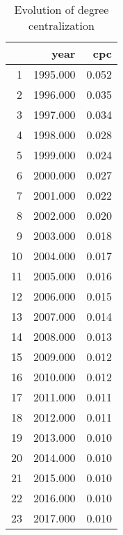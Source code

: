 \begin{table}[ht]
\centering
\begin{tabular}{rrr}
  \hline
 & year & cpc \\ 
  \hline
1 & 1995.000 & 0.052 \\ 
  2 & 1996.000 & 0.035 \\ 
  3 & 1997.000 & 0.034 \\ 
  4 & 1998.000 & 0.028 \\ 
  5 & 1999.000 & 0.024 \\ 
  6 & 2000.000 & 0.027 \\ 
  7 & 2001.000 & 0.022 \\ 
  8 & 2002.000 & 0.020 \\ 
  9 & 2003.000 & 0.018 \\ 
  10 & 2004.000 & 0.017 \\ 
  11 & 2005.000 & 0.016 \\ 
  12 & 2006.000 & 0.015 \\ 
  13 & 2007.000 & 0.014 \\ 
  14 & 2008.000 & 0.013 \\ 
  15 & 2009.000 & 0.012 \\ 
  16 & 2010.000 & 0.012 \\ 
  17 & 2011.000 & 0.011 \\ 
  18 & 2012.000 & 0.011 \\ 
  19 & 2013.000 & 0.010 \\ 
  20 & 2014.000 & 0.010 \\ 
  21 & 2015.000 & 0.010 \\ 
  22 & 2016.000 & 0.010 \\ 
  23 & 2017.000 & 0.010 \\ 
   \hline
\end{tabular}
\caption{Evolution of degree centralization} 
\end{table}
